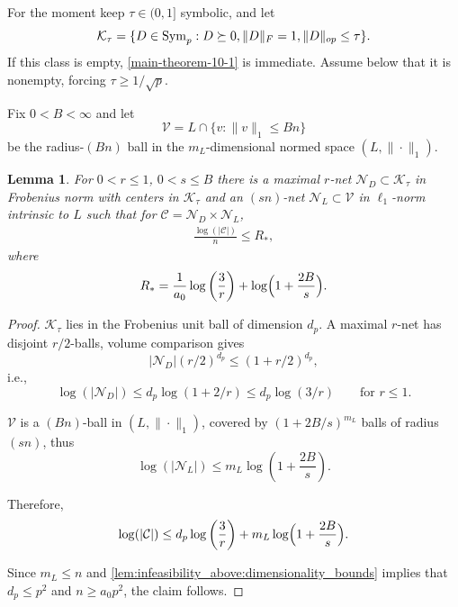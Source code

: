 \documentclass[11pt]{article}
\numberwithin{equation}{section}
\newtheorem{lemma}[theorem]{Lemma}
\theoremstyle{definition}
\theoremstyle{remark}
\newcommand{\1}{\boldsymbol 1}
\begin{document}
\begin{aiblock}
For the moment keep $\tau \in (0,1]$ symbolic, and let
\[
    \mathcal K_\tau = \{D \in {\rm Sym}_p : D \succeq 0, \|D\|_F = 1, \|D\|_{op} \le \tau\}.
\]
If this class is empty, \cref{main-theorem-10-1} is immediate. Assume below that it is nonempty, forcing $\tau \geq 1 / \sqrt{p}$.

Fix $0 < B < \infty$ and let
\[
    \mathcal V = L\cap\{v : \|v\|_1 \le B n\}
\]
be the radius-$(B n)$ ball in the $m_L$-dimensional normed space $(L,\|\cdot\|_1)$.

\begin{lemma} \label{lem:infeasibility_above:nets-entropy}
    For $0 < r \le 1$, $0 < s \le B$ there is a maximal $r$-net $\mathcal N_D \subset {\mathcal K}_\tau$ in Frobenius norm with centers in ${\mathcal K}_\tau$ and an $(s n)$-net $\mathcal N_L \subset \mathcal V$ in $\ell_1$-norm intrinsic to $L$ such that for $\mathcal C = \mathcal N_D \times \mathcal N_L$,
    \begin{align*}
        \frac{\log(|\mathcal C|)}{n} \le R_*,
    \end{align*}
    where
    \[
        R_* = \frac{1}{a_0} \log\left(\frac{3}{r}\right) + \log \Bigl(1 + \frac{2 B}{s}\Bigr).
    \]
\end{lemma}

\begin{proof}
    ${\mathcal K}_\tau$ lies in the Frobenius unit ball of dimension $d_p$.
    A maximal $r$-net has disjoint $r / 2$-balls, volume comparison gives
    \[
        |\mathcal N_D| (r / 2)^{d_p} \le (1 + r / 2)^{d_p},
    \]
    i.e.,
    \[
        \log(|\mathcal N_D|) \le d_p \log(1 + 2 / r) \le d_p \log(3 / r) \qquad \text{for $r \le 1$}.
    \]
    
    $\mathcal V$ is a $(B n)$-ball in $(L , \|\cdot\|_1)$, covered by $(1 + 2 B / s)^{m_L}$ balls of radius $(s n)$, thus
    \[
        \log(|\mathcal N_L|) \le m_L \log\left(1 + \frac{2 B}{s}\right).
    \]
    
    Therefore,
    \begin{align*}
        \log(|\mathcal C|) \le d_p \log\left(\frac{3}{r}\right) + m_L \log\Bigl(1 + \frac{2 B}{s}\Bigr).
    \end{align*}
    
    Since $m_L \leq n$ and \cref{lem:infeasibility_above:dimensionality_bounds} implies that $d_p \le p^2$ and $n \ge a_0 p^2$, the claim follows.
\end{proof}




\end{aiblock}
\end{document}
